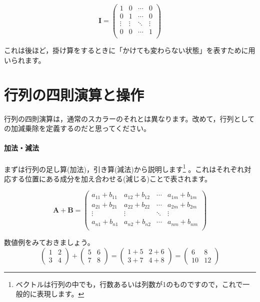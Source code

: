\documentclass{ltjsbook}
\begin{document}
\begin{equation*}
    \bm{I} =
    \begin{pmatrix}
        1      & 0      & \cdots & 0      \\
        0      & 1      & \cdots & 0      \\
        \vdots & \vdots & \ddots & \vdots \\
        0      & 0      & \cdots & 1      \\
    \end{pmatrix}
\end{equation*}


これは後ほど，掛け算をするときに「かけても変わらない状態」を表すために用いられます。



\section{行列の四則演算と操作}
行列の四則演算は，通常のスカラーのそれとは異なります。改めて，行列としての加減乗除を定義するのだと思ってください。

\paragraph{加法・減法}
まずは行列の足し算(加法)，引き算(減法)から説明します\footnote{ベクトルは行列の中でも，行数あるいは列数が1のものですので，これで一般的に表現します。} 。これはそれぞれ対応する位置にある成分を加え合わせる(減じる)ことで表されます。

\begin{equation*}
    \bm{A}+\bm{B} =
    \begin{pmatrix}
        a_{11}+b_{11} & a_{12}+b_{12} & \cdots & a_{1m}+b_{1m} \\
        a_{21}+b_{21} & a_{22}+b_{22} & \cdots & a_{2m}+b_{2m} \\
        \vdots        & \vdots        & \ddots & \vdots        \\
        a_{n1}+b_{n1} & a_{n2}+b_{n2} & \cdots & a_{nm}+b_{nm} \\
    \end{pmatrix}
\end{equation*}

数値例をみておきましょう。
\begin{equation*}
    \begin{pmatrix}
        1 & 2 \\
        3 & 4
    \end{pmatrix}
    +
    \begin{pmatrix}
        5 & 6 \\
        7 & 8
    \end{pmatrix}
    =
    \begin{pmatrix}
        1+5 & 2+6 \\
        3+7 & 4+8
    \end{pmatrix}
    =
    \begin{pmatrix}
        6  & 8  \\
        10 & 12
    \end{pmatrix}
\end{equation*}
\end{document}
